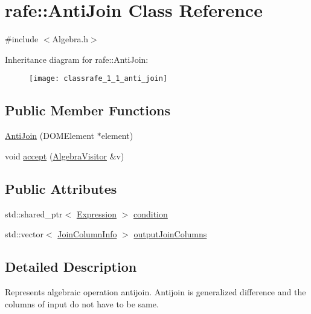\hypertarget{classrafe_1_1_anti_join}{\section{rafe\+:\+:Anti\+Join Class Reference}
\label{classrafe_1_1_anti_join}
}


{\ttfamily \#include $<$Algebra.\+h$>$}

Inheritance diagram for rafe\+:\+:Anti\+Join\+:\begin{figure}[H]
\begin{center}
\leavevmode
\texttt{[image: classrafe\_1\_1\_anti\_join]}
\end{center}
\end{figure}
\subsection*{Public Member Functions}
\begin{DoxyCompactItemize}
\item 
\hyperlink{classrafe_1_1_anti_join_a0f74edfc2442c9d091d15f4503702227}{Anti\+Join} (D\+O\+M\+Element $\ast$element)
\item 
void \hyperlink{classrafe_1_1_anti_join_a6f4599cefdf10f6966239a3307c98621}{accept} (\hyperlink{classrafe_1_1_algebra_visitor}{Algebra\+Visitor} \&v)
\end{DoxyCompactItemize}
\subsection*{Public Attributes}
\begin{DoxyCompactItemize}
\item 
std\+::shared\+\_\+ptr$<$ \hyperlink{classrafe_1_1_expression}{Expression} $>$ \hyperlink{classrafe_1_1_anti_join_a7eff7c54fb08dfefa4171080cd48fadc}{condition}
\item 
std\+::vector$<$ \hyperlink{classrafe_1_1_join_column_info}{Join\+Column\+Info} $>$ \hyperlink{classrafe_1_1_anti_join_a46d9e31d624610f99d6708fd5aee68be}{output\+Join\+Columns}
\end{DoxyCompactItemize}


\subsection{Detailed Description}
Represents algebraic operation antijoin. Antijoin is generalized difference and the columns of input do not have to be same. 


